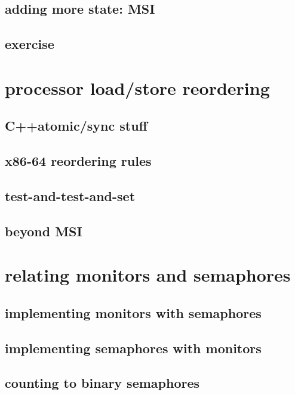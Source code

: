 \subsection{adding more state: MSI}


\subsection{exercise}



\section{processor load/store reordering}


\subsection{C++atomic/sync stuff}


\subsection{x86-64 reordering rules}




\subsection{test-and-test-and-set}




\subsection{beyond MSI}


\section{relating monitors and semaphores}

\subsection{implementing monitors with semaphores}

 

\subsection{implementing semaphores with monitors}




\subsection{counting to binary semaphores}


